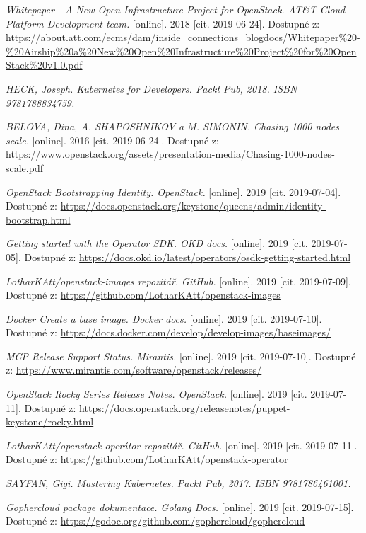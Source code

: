 \begin{thebibliography}{10}
    \emph{Whitepaper - A New Open Infrastructure Project for OpenStack. AT\&T Cloud Platform Development team.} [online]. 2018 [cit. 2019-06-24]. Dostupné z: \url{https://about.att.com/ecms/dam/inside_connections_blogdocs/Whitepaper\%20-\%20Airship\%20a\%20New\%20Open\%20Infrastructure\%20Project\%20for\%20OpenStack\%20v1.0.pdf}

    \emph{HECK, Joseph. Kubernetes for Developers. Packt Pub, 2018. ISBN 9781788834759.}
    	
    \emph{BELOVA, Dina, A. SHAPOSHNIKOV a M. SIMONIN. Chasing 1000 nodes scale.} [online]. 2016 [cit. 2019-06-24]. Dostupné z: \url{https://www.openstack.org/assets/presentation-media/Chasing-1000-nodes-scale.pdf}

    \emph{OpenStack Bootstrapping Identity. OpenStack.} [online]. 2019 [cit. 2019-07-04]. Dostupné z: \url{https://docs.openstack.org/keystone/queens/admin/identity-bootstrap.html}

    \emph{Getting started with the Operator SDK. OKD docs.} [online]. 2019 [cit. 2019-07-05]. Dostupné z: \url{https://docs.okd.io/latest/operators/osdk-getting-started.html}

    \emph{LotharKAtt/openstack-images repozitář. GitHub.} [online]. 2019 [cit. 2019-07-09]. Dostupné z: \url{https://github.com/LotharKAtt/openstack-images}

    \emph{Docker Create a base image. Docker docs.} [online]. 2019 [cit. 2019-07-10]. Dostupné z: \url{https://docs.docker.com/develop/develop-images/baseimages/}

    \emph{MCP Release Support Status. Mirantis.} [online]. 2019 [cit. 2019-07-10]. Dostupné z: \url{https://www.mirantis.com/software/openstack/releases/}

    \emph{OpenStack Rocky Series Release Notes. OpenStack.} [online]. 2019 [cit. 2019-07-11]. Dostupné z: \url{https://docs.openstack.org/releasenotes/puppet-keystone/rocky.html}
    
    \emph{LotharKAtt/openstack-operátor repozitář. GitHub.} [online]. 2019 [cit. 2019-07-11]. Dostupné z: \url{https://github.com/LotharKAtt/openstack-operator}


    \emph{SAYFAN, Gigi. Mastering Kubernetes. Packt Pub, 2017. ISBN 9781786461001.}

    \emph{Gophercloud package dokumentace. Golang Docs.} [online]. 2019 [cit. 2019-07-15]. Dostupné z: \url{https://godoc.org/github.com/gophercloud/gophercloud}

\end{thebibliography}
